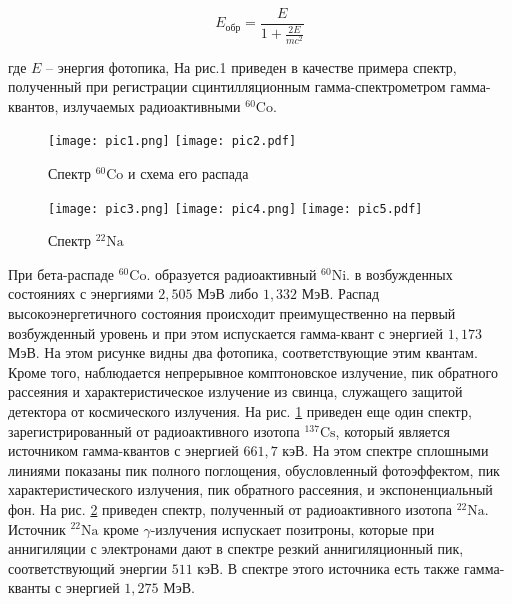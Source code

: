 \begin{equation}
  E_{\text{обр}} = \frac{E}{1 + \frac{2 E}{m c^2}}
\end{equation}

где $E$ -- энергия фотопика, На рис.1 приведен в качестве примера спектр,
полученный при регистрации сцинтилляционным гамма-спектрометром гамма-квантов,
излучаемых радиоактивными ${}^{60}{\text{Co}}$.

\begin{figure}[h!]
  \centering
  \texttt{[image: pic1.png]}
  \texttt{[image: pic2.pdf]}
  \caption{Спектр ${}^{60}{\text{Co}}$ и схема его распада}
  \label{pic:Cobalt}
\end{figure}

\begin{figure}
  \centering
  \texttt{[image: pic3.png]}
  \texttt{[image: pic4.png]}
  \texttt{[image: pic5.pdf]}
  \caption{Спектр ${}^{22}{\text{Na}}$}
  \label{pic:Natrium}
\end{figure}

При бета-распаде ${}^{60}{\text{Co}}$. образуется радиоактивный
${}^{60}{\text{Ni}}$. в возбужденных состояниях с энергиями $2,505$ МэВ либо
$1,332$ МэВ. Распад высокоэнергетичного состояния происходит преимущественно на
первый возбужденный уровень и при этом испускается гамма-квант с энергией
$1,173$ МэВ. На этом рисунке видны два фотопика, соответствующие этим квантам.
Кроме того, наблюдается непрерывное комптоновское излучение, пик обратного
рассеяния и характеристическое излучение из свинца, служащего защитой детектора
от космического излучения. На рис. \ref{pic:Cobalt} приведен еще один спектр,
зарегистрированный от радиоактивного изотопа ${}^{137}{\text{Cs}}$, который
является источником гамма-квантов с энергией $661,7$ кэВ. На этом спектре
сплошными линиями показаны пик полного поглощения, обусловленный фотоэффектом,
пик характеристического излучения, пик обратного рассеяния, и экспоненциальный
фон. На рис. \ref{pic:Natrium} приведен спектр, полученный от радиоактивного
изотопа ${}^{22}{\text{Na}}$. Источник ${}^{22}{\text{Na}}$ кроме
$\gamma$-излучения испускает позитроны, которые при аннигиляции с электронами
дают в спектре резкий аннигиляционный пик, соответствующий энергии $511$ кэВ. В
спектре этого источника есть также гамма-кванты с энергией $1,275$ МэВ.
